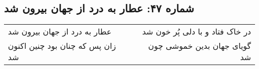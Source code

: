 \begin{center}
\section*{شماره ۴۷: عطار به درد از جهان بیرون شد}
\label{sec:047}
\begin{longtable}{l p{0.5cm} r}
عطار به درد از جهان بیرون شد
&&
در خاک فتاد و با دلی پُر خون شد
\\
زان پس که چنان بود چنین اکنون شد
&&
گویای جهان بدین خموشی چون شد
\\
\end{longtable}
\end{center}
